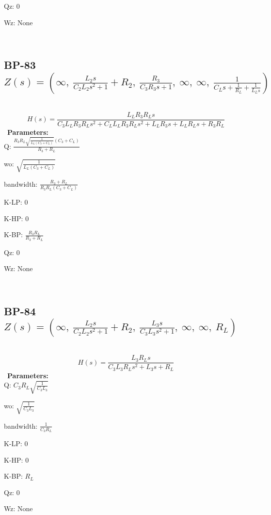 \documentclass{article}
\begin{document}
Qz: $0$\ 

Wz: $\text{None}$\ 

\ 

\subsection{BP-83 $Z(s) = \left( \infty, \  \frac{L_{2} s}{C_{2} L_{2} s^{2} + 1} + R_{2}, \  \frac{R_{3}}{C_{3} R_{3} s + 1}, \  \infty, \  \infty, \  \frac{1}{C_{L} s + \frac{1}{R_{L}} + \frac{1}{L_{L} s}}\right)$ } \ 
\textbf{\[H(s) = \frac{L_{L} R_{3} R_{L} s}{C_{3} L_{L} R_{3} R_{L} s^{2} + C_{L} L_{L} R_{3} R_{L} s^{2} + L_{L} R_{3} s + L_{L} R_{L} s + R_{3} R_{L}}\] } \ 
\textbf{Parameters:}\\ 

Q: $\frac{R_{3} R_{L} \sqrt{\frac{1}{L_{L} \left(C_{3} + C_{L}\right)}} \left(C_{3} + C_{L}\right)}{R_{3} + R_{L}}$\ 

wo: $\sqrt{\frac{1}{L_{L} \left(C_{3} + C_{L}\right)}}$\ 

bandwidth: $\frac{R_{3} + R_{L}}{R_{3} R_{L} \left(C_{3} + C_{L}\right)}$\ 

K-LP: $0$\ 

K-HP: $0$\ 

K-BP: $\frac{R_{3} R_{L}}{R_{3} + R_{L}}$\ 

Qz: $0$\ 

Wz: $\text{None}$\ 

\ 

\subsection{BP-84 $Z(s) = \left( \infty, \  \frac{L_{2} s}{C_{2} L_{2} s^{2} + 1} + R_{2}, \  \frac{L_{3} s}{C_{3} L_{3} s^{2} + 1}, \  \infty, \  \infty, \  R_{L}\right)$ } \ 
\textbf{\[H(s) = \frac{L_{3} R_{L} s}{C_{3} L_{3} R_{L} s^{2} + L_{3} s + R_{L}}\] } \ 
\textbf{Parameters:}\\ 

Q: $C_{3} R_{L} \sqrt{\frac{1}{C_{3} L_{3}}}$\ 

wo: $\sqrt{\frac{1}{C_{3} L_{3}}}$\ 

bandwidth: $\frac{1}{C_{3} R_{L}}$\ 

K-LP: $0$\ 

K-HP: $0$\ 

K-BP: $R_{L}$\ 

Qz: $0$\ 

Wz: $\text{None}$\ 

\ 
\end{document}
